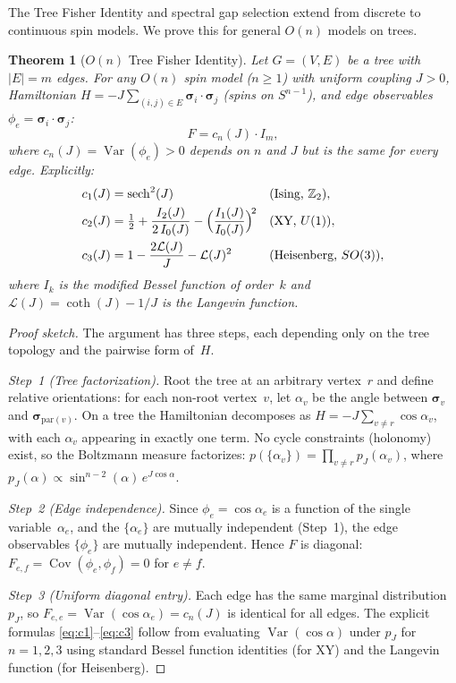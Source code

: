 \documentclass[11pt]{article}
\newtheorem{theorem}{Theorem}[section]
\theoremstyle{definition}
\theoremstyle{remark}
\begin{document}
The Tree Fisher Identity and spectral gap selection extend from discrete
to continuous spin models. We prove this for general $O(n)$ models on trees.

\begin{theorem}[$O(n)$ Tree Fisher Identity]
\label{thm:On-tree-fisher}
Let $G = (V, E)$ be a tree with $|E| = m$ edges. For any $O(n)$ spin model
($n \geq 1$) with uniform coupling $J > 0$, Hamiltonian
$H = -J \sum_{(i,j) \in E} \boldsymbol{\sigma}_i \cdot \boldsymbol{\sigma}_j$
(spins on $S^{n-1}$), and edge observables
$\phi_e = \boldsymbol{\sigma}_i \cdot \boldsymbol{\sigma}_j$:
\begin{equation}
  F = c_n(J) \cdot I_m,
  \label{eq:On-tree-fisher}
\end{equation}
where $c_n(J) = \operatorname{Var}(\phi_e) > 0$ depends on $n$ and $J$ but
is the same for every edge. Explicitly:
\begin{align}
  c_1(J) &= \operatorname{sech}^2(J)
    && \text{(Ising, $\mathbb{Z}_2$)}, \label{eq:c1} \\
  c_2(J) &= \tfrac{1}{2} + \frac{I_2(J)}{2\,I_0(J)}
    - \Bigl(\frac{I_1(J)}{I_0(J)}\Bigr)^{\!2}
    && \text{(XY, $U(1)$)}, \label{eq:c2} \\
  c_3(J) &= 1 - \frac{2\mathcal{L}(J)}{J} - \mathcal{L}(J)^2
    && \text{(Heisenberg, $SO(3)$)}, \label{eq:c3}
\end{align}
where $I_k$ is the modified Bessel function of order~$k$ and
$\mathcal{L}(J) = \coth(J) - 1/J$ is the Langevin function.
\end{theorem}

\begin{proof}[Proof sketch]
The argument has three steps, each depending only on the tree topology
and the pairwise form of~$H$.

\emph{Step~1 (Tree factorization).}
Root the tree at an arbitrary vertex~$r$ and define relative orientations:
for each non-root vertex~$v$, let $\alpha_v$ be the angle between
$\boldsymbol{\sigma}_v$ and $\boldsymbol{\sigma}_{\mathrm{par}(v)}$.
On a tree the Hamiltonian decomposes as
$H = -J \sum_{v \neq r} \cos\alpha_v$, with each $\alpha_v$ appearing
in exactly one term. No cycle constraints (holonomy) exist, so the
Boltzmann measure factorizes:
$p(\{\alpha_v\}) = \prod_{v \neq r} p_J(\alpha_v)$,
where $p_J(\alpha) \propto \sin^{n-2}(\alpha)\,e^{J\cos\alpha}$.

\emph{Step~2 (Edge independence).}
Since $\phi_e = \cos\alpha_e$ is a function of the single variable~$\alpha_e$,
and the $\{\alpha_e\}$ are mutually independent (Step~1), the edge
observables $\{\phi_e\}$ are mutually independent. Hence $F$ is diagonal:
$F_{e,f} = \operatorname{Cov}(\phi_e, \phi_f) = 0$ for $e \neq f$.

\emph{Step~3 (Uniform diagonal entry).}
Each edge has the same marginal distribution $p_J$, so
$F_{e,e} = \operatorname{Var}(\cos\alpha_e) = c_n(J)$ is identical for
all edges. The explicit formulas \eqref{eq:c1}--\eqref{eq:c3} follow from
evaluating $\operatorname{Var}(\cos\alpha)$ under $p_J$ for $n = 1, 2, 3$
using standard Bessel function identities (for XY) and the Langevin function
(for Heisenberg).
\end{proof}
\end{document}
